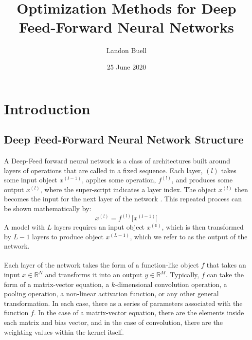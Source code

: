\documentclass[12pt,letterpaper]{article}
\begin{document}

\title{Optimization Methods for Deep Feed-Forward Neural Networks}
\author{Landon Buell}
\date{25 June 2020}
\maketitle


\section{Introduction}


\subsection{Deep Feed-Forward Neural Network Structure}

\paragraph*{}A Deep-Feed forward neural network is a class of architectures built around layers of operations that are called in a fixed sequence. Each layer, $(l)$ takes some input object $x^{(l-1)}$, applies some operation, $f^{(l)}$, and produces some output $x^{(l)}$, where the super-script indicates a layer index. The object $x^{(l)}$ then becomes the input for the next layer of the network \cite{Geron,Goodfellow}. This repeated process can be shown mathematically by:
\begin{equation}
\label{feed-forward}
x^{(l)} = f^{(l)}\big[x^{(l-1)}\big]
\end{equation}
A model with $L$ layers requires an input object $x^{(0)}$, which is then transformed by $L-1$ layers to produce object $x^{(L-1)}$, which we refer to as the output of the network.

\paragraph*{}Each layer of the network takes the form of a function-like object $f$ that takes an input $x \in \mathbb{R}^N$ and transforms it into an output $y \in \mathbb{R}^M$. Typically, $f$ can take the form of a matrix-vector equation, a $k$-dimensional convolution operation, a pooling operation, a non-linear activation function, or any other general transformation. In each case, there as a series of parameters associated with the function $f$. In the case of a matrix-vector equation, there are the elements inside each matrix and bias vector, and in the case of convolution, there are the weighting values within the kernel itself. 
\end{document}
